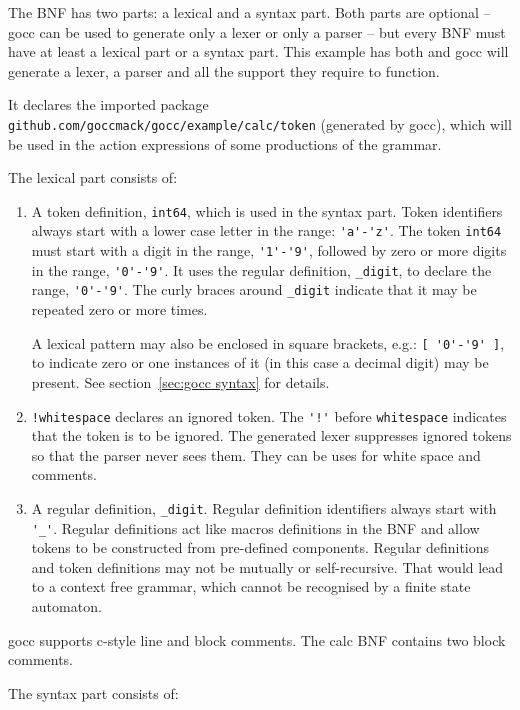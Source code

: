 \documentclass[12pt]{article}
\begin{document}
		The BNF has two parts: a lexical and a syntax part. Both parts are optional -- gocc can be used to generate only a lexer or only a parser -- but every BNF must have at least a lexical part or a syntax part. This example has both and gocc will generate a lexer, a parser and all the support they require to function.

		It declares the imported package \verb|github.com/goccmack/gocc/example/calc/token| (generated by gocc), which will be used in the action expressions of some productions of the grammar.

		The lexical part consists of:

		\begin{enumerate}
			\item A token definition, \verb|int64|, which is used in the syntax part. Token identifiers always start with a lower case letter in the range: \verb|'a'-'z'|. The token \verb|int64| must start with a digit in the range, \verb|'1'-'9'|, followed by zero or more digits in the range, \verb|'0'-'9'|. It uses the regular definition, \verb|_digit|, to declare the range, \verb|'0'-'9'|. The curly braces around \verb|_digit| indicate that it may be repeated zero or more times.

			A lexical pattern may also be enclosed in square brackets, e.g.: \verb|[ '0'-'9' ]|, to indicate zero or one instances of it (in this case a decimal digit) may be present. See section~\ref{sec:gocc syntax} for details.

			\item \verb|!whitespace| declares an ignored token. The \verb|'!'| before \verb|whitespace| indicates that the token is to be ignored. The generated lexer suppresses ignored tokens so that the parser never sees them. They can be uses for white space and comments.

			\item A regular definition, \verb|_digit|. Regular definition identifiers always start with \verb|'_'|. Regular definitions act like macros definitions in the BNF and allow tokens to be constructed from pre-defined components. Regular definitions and token definitions may not be mutually or self-recursive. That would lead to a context free grammar, which cannot be recognised by a finite state automaton.
		\end{enumerate}

		gocc supports c-style line and block comments. The calc BNF contains two block comments.

		The syntax part consists of:
\end{document}
